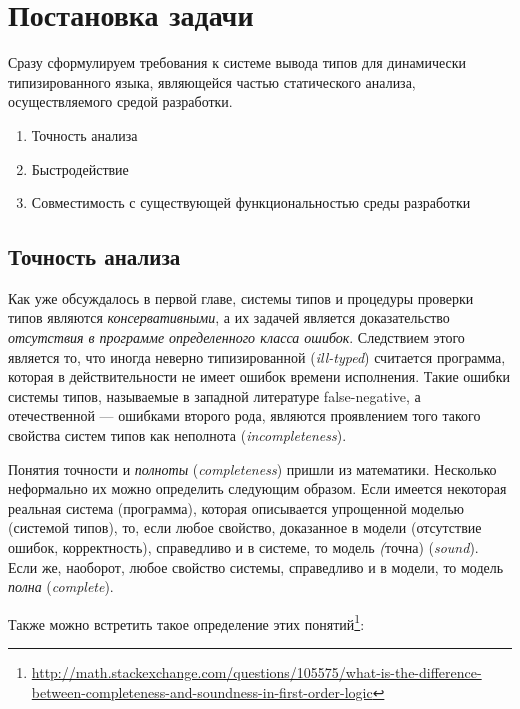 \chapter{Постановка задачи}

Сразу сформулируем требования к системе вывода типов для динамически
типизированного языка, являющейся частью статического анализа, осуществляемого
средой разработки.

\begin{enumerate}
    \item{Точность анализа}
    \item{Быстродействие}
    \item{Совместимость с существующей функциональностью среды разработки}
\end{enumerate}

\section{Точность анализа}
\label{sec:precision-requirement}

Как уже обсуждалось в первой главе, системы типов и процедуры проверки типов
являются \emph{консервативными}, а их задачей является доказательство
\emph{отсутствия в программе определенного класса ошибок}.  Следствием этого
является то, что иногда неверно типизированной (\emph{ill-typed}) считается
программа, которая в действительности не имеет ошибок времени исполнения. Такие
ошибки системы типов, называемые в западной литературе false-negative, а
отечественной --- ошибками второго рода, являются проявлением того такого
свойства систем типов как неполнота (\emph{incompleteness}). 

Понятия точности и \emph{полноты} (\emph{completeness}) пришли из математики. Несколько
неформально их можно определить следующим образом. Если имеется некоторая
реальная система (программа), которая описывается упрощенной моделью (системой
типов), то, если любое свойство, доказанное в модели (отсутствие ошибок,
корректность), справедливо и в системе, то модель \emph(точна) (\emph{sound}).
Если же, наоборот, любое свойство системы, справедливо и в модели, то модель
\emph{полна} (\emph{complete}).

Также можно встретить такое определение этих
понятий\footnote{\url{http://math.stackexchange.com/questions/105575/what-is-the-difference-between-completeness-and-soundness-in-first-order-logic}}:

